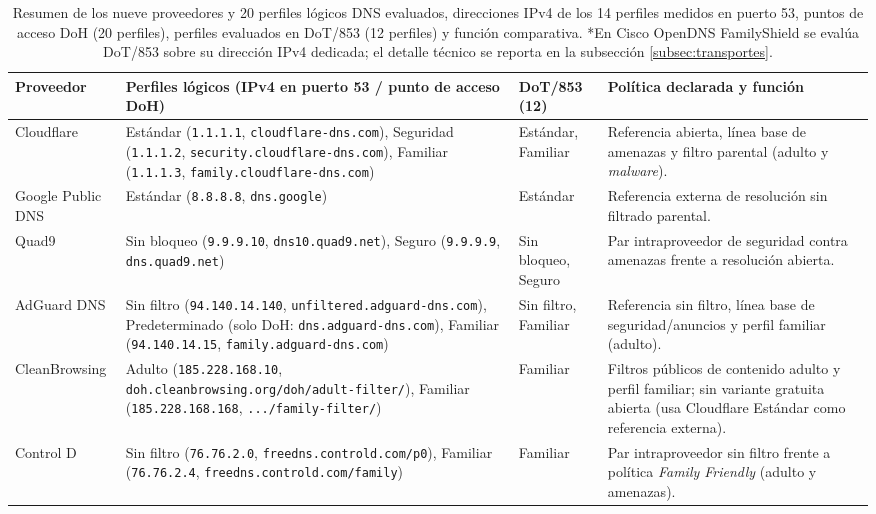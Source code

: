 \documentclass[10pt,a4paper]{article}
\begin{document}
\begin{table}[H]
\centering\scriptsize
\caption{Resumen de los nueve proveedores y 20 perfiles lógicos DNS evaluados, direcciones IPv4 de los 14 perfiles medidos en puerto 53, puntos de acceso DoH (20 perfiles), perfiles evaluados en DoT/853 (12 perfiles) y función comparativa. *En Cisco OpenDNS FamilyShield se evalúa DoT/853 sobre su dirección IPv4 dedicada; el detalle técnico se reporta en la subsección \ref{subsec:transportes}.}
\label{tab:perfiles}
\begin{tabularx}{\textwidth}{>{\raggedright\arraybackslash}p{2.05cm}>{\raggedright\arraybackslash}p{5.85cm}>{\raggedright\arraybackslash}p{1.80cm}Y}
\toprule
Proveedor & Perfiles lógicos (IPv4 en puerto 53 / punto de acceso DoH) & DoT/853 (12) & Política declarada y función\\
\midrule
Cloudflare \cite{cloudflare} & Estándar (\texttt{1.1.1.1}, \texttt{cloudflare-dns.com}), Seguridad (\texttt{1.1.1.2}, \texttt{security.cloudflare-dns.com}), Familiar (\texttt{1.1.1.3}, \texttt{family.cloudflare-dns.com}) & Estándar, Familiar & Referencia abierta, línea base de amenazas y filtro parental (adulto y \emph{malware}).\\
Google Public DNS \cite{google} & Estándar (\texttt{8.8.8.8}, \texttt{dns.google}) & Estándar & Referencia externa de resolución sin filtrado parental.\\
Quad9 \cite{quad9} & Sin bloqueo (\texttt{9.9.9.10}, \texttt{dns10.quad9.net}), Seguro (\texttt{9.9.9.9}, \texttt{dns.quad9.net}) & Sin bloqueo, Seguro & Par intraproveedor de seguridad contra amenazas frente a resolución abierta.\\
AdGuard DNS \cite{adguardpublic} & Sin filtro (\texttt{94.140.14.140}, \texttt{unfiltered.adguard-dns.com}), Predeterminado (solo DoH: \texttt{dns.adguard-dns.com}), Familiar (\texttt{94.140.14.15}, \texttt{family.adguard-dns.com}) & Sin filtro, Familiar & Referencia sin filtro, línea base de seguridad/anuncios y perfil familiar (adulto).\\
CleanBrowsing \cite{cleanbrowsingfree} & Adulto (\texttt{185.228.168.10}, \texttt{doh.cleanbrowsing.org/doh/adult-filter/}), Familiar (\texttt{185.228.168.168}, \texttt{.../family-filter/}) & Familiar & Filtros públicos de contenido adulto y perfil familiar; sin variante gratuita abierta (usa Cloudflare Estándar como referencia externa).\\
Control D \cite{controldfree} & Sin filtro (\texttt{76.76.2.0}, \texttt{freedns.controld.com/p0}), Familiar (\texttt{76.76.2.4}, \texttt{freedns.controld.com/family}) & Familiar & Par intraproveedor sin filtro frente a política \emph{Family Friendly} (adulto y amenazas).\\

\end{tabularx}
\end{table}
\end{document}
